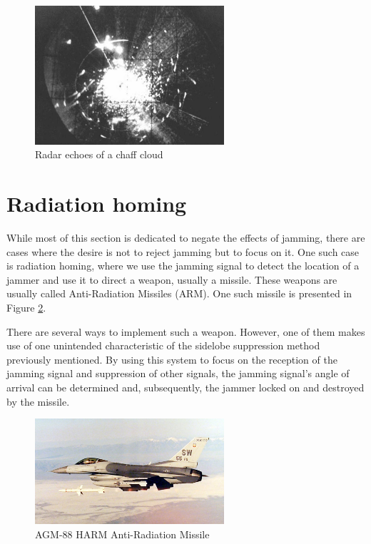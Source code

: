 \documentclass[english,purist]{ist-report}
\begin{document}
\begin{figure}[ht]
\centering
\includegraphics[width=70mm]{chaff_radarjpg.jpg}
\caption{Radar echoes of a chaff cloud}
\label{chaff_cloud_echo}
\end{figure} 


\section{Radiation homing}

While most of this section is dedicated to negate the effects of jamming, there are cases where the desire is not to reject jamming but to focus on it. One such case is radiation homing, where we use the jamming signal to detect the location of a jammer and use it to direct a weapon, usually a missile. These weapons are usually called Anti-Radiation Missiles (ARM). One such missile is presented in Figure \ref{arm_missile}.

There are several ways to implement such a weapon. However, one of them makes use of one unintended characteristic of the sidelobe suppression method previously mentioned. By using this system to focus on the reception of the jamming signal and suppression of other signals, the jamming signal's angle of arrival can be determined and, subsequently, the jammer locked on and destroyed by the missile.

\begin{figure}[ht]
\centering
\includegraphics[width=70mm]{arm_missile.jpg}
\caption{AGM-88 HARM Anti-Radiation Missile}
\label{arm_missile}
\end{figure}
\end{document}

